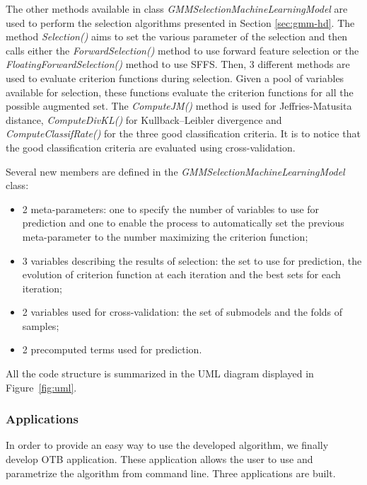 \documentclass[a4paper,11pt,DIV=16,abstracton]{scrartcl}
\begin{document}
        The other methods available in class \emph{GMMSelectionMachineLearningModel} are used to perform the selection algorithms presented in Section \ref{sec:gmm-hd}. The method \emph{Selection()} aims to set the various parameter of the selection and then calls either the \emph{ForwardSelection()} method to use forward feature selection or the \emph{FloatingForwardSelection()} method to use SFFS. Then, 3 different methods are used to evaluate criterion functions during selection. Given a pool of variables available for selection, these functions evaluate the criterion functions for all the possible augmented set. The \emph{ComputeJM()} method is used for Jeffries-Matusita distance, \emph{ComputeDivKL()} for Kullback–Leibler divergence and \emph{ComputeClassifRate()} for the three good classification criteria. It is to notice that the good classification criteria are evaluated using cross-validation.

        Several new members are defined in the \emph{GMMSelectionMachineLearningModel} class:
        \begin{itemize}
            \item 2 meta-parameters: one to specify the number of variables to use for prediction and one to enable the process to automatically set the previous meta-parameter to the number maximizing the criterion function;
            \item 3 variables describing the results of selection: the set to use for prediction, the evolution of criterion function at each iteration and the best sets for each iteration;
            \item 2 variables used for cross-validation: the set of submodels and the folds of samples;
            \item 2 precomputed terms used for prediction.
        \end{itemize}

        All the code structure is summarized in the UML diagram displayed in Figure~\ref{fig:uml}.

        \subsubsection{Applications}

        In order to provide an easy way to use the developed algorithm, we finally develop OTB application. These application allows the user to use and parametrize the algorithm from command line. Three applications are built.
\end{document}
